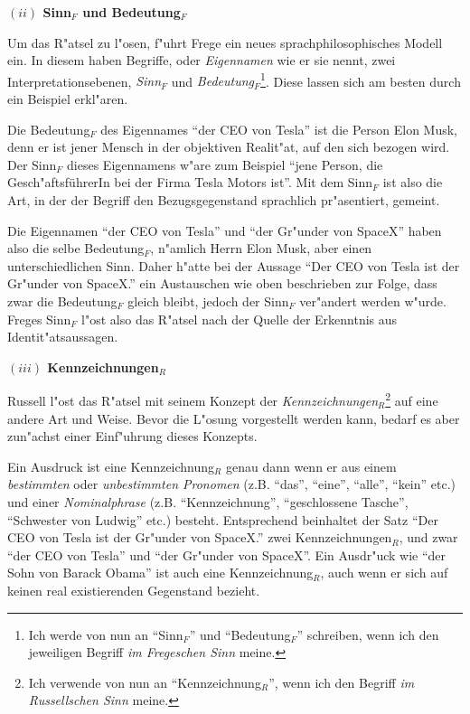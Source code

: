 \documentclass[a4paper, emulatestandardclasses, 12pt]{scrartcl}
\begin{document}
\begin{onehalfspace}
\noindent\textbf{$(ii)$ Sinn$_{F}$ und Bedeutung$_{F}$}	

\noindent Um das R"atsel zu l"osen, f"uhrt Frege ein neues sprachphilosophisches Modell ein. In diesem haben Begriffe, oder \emph{Eigennamen} wie er sie nennt, zwei Interpretationsebenen, \emph{Sinn$_{F}$} und \emph{Bedeutung$_{F}$}\footnote{Ich werde von nun an "`Sinn$_{F}$"' und "`Bedeutung$_{F}$"' schreiben, wenn ich den jeweiligen Begriff \emph{im Fregeschen Sinn} meine.}. Diese lassen sich am besten durch ein Beispiel erkl"aren.

Die Bedeutung$_{F}$ des Eigennames "`der CEO von Tesla"' ist die Person Elon Musk, denn er ist jener Mensch in der objektiven Realit"at, auf den sich bezogen wird. Der Sinn$_{F}$ dieses Eigennamens w"are zum Beispiel  "`jene Person, die Gesch"aftsführerIn bei der Firma Tesla Motors ist"'. Mit dem Sinn$_{F}$ ist also die Art, in der der Begriff den Bezugsgegenstand sprachlich pr"asentiert, gemeint.

Die Eigennamen "`der CEO von Tesla"' und "`der Gr"under von SpaceX"' haben also die selbe Bedeutung$_{F}$, n"amlich Herrn Elon Musk, aber einen unterschiedlichen Sinn. Daher h"atte bei der Aussage "`Der CEO von Tesla ist der Gr"under von SpaceX."' ein Austauschen wie oben beschrieben zur Folge, dass zwar die Bedeutung$_{F}$ gleich bleibt, jedoch der Sinn$_{F}$ ver"andert werden w"urde. Freges Sinn$_{F}$ l"ost also das R"atsel nach der Quelle der Erkenntnis aus Identit"atsaussagen. \vspace{3mm}

\noindent\textbf{$(iii)$ Kennzeichnungen$_{R}$}	

\noindent Russell l"ost das R"atsel mit seinem Konzept der \emph{Kennzeichnungen}$_{R}$\footnote{Ich verwende von nun an "`Kennzeichnung$_{R}$"', wenn ich den Begriff \emph{im Russellschen Sinn} meine.} auf eine andere Art und Weise. Bevor die L"osung vorgestellt werden kann, bedarf es aber zun"achst einer Einf"uhrung dieses Konzepts. 

Ein Ausdruck ist eine Kennzeichnung$_{R}$ genau dann wenn er aus einem \emph{bestimmten} oder \emph{unbestimmten Pronomen} (z.B. "`das"', "`eine"', "`alle"', "`kein"' etc.) und einer \emph{Nominalphrase} (z.B. "`Kennzeichnung"', "`geschlossene Tasche"', "`Schwester von Ludwig"' etc.) besteht. Entsprechend beinhaltet der Satz "`Der CEO von Tesla ist der Gr"under von SpaceX."' zwei Kennzeichnungen$_{R}$, und zwar "`der CEO von Tesla"' und "`der Gr"under von SpaceX"'. Ein Ausdr"uck wie "`der Sohn von Barack Obama"' ist auch eine Kennzeichnung$_{R}$, auch wenn er sich auf keinen real existierenden Gegenstand bezieht. 


\end{onehalfspace}
\end{document}
